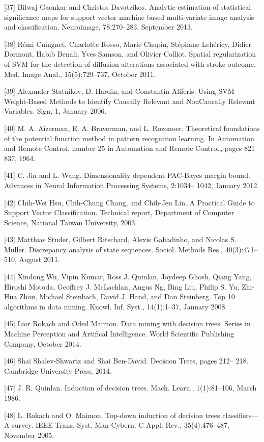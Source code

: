 \documentclass[preprint,12pt]{elsarticle}
\begin{document}
[37] Bilwaj Gaonkar and Christos Davatzikos. Analytic estimation of statistical significance maps for support vector machine based multi-variate image analysis and classification. Neuroimage, 78:270–283, September 2013. 

[38] Rémi Cuingnet, Charlotte Rosso, Marie Chupin, Stéphane Lehéricy, Didier Dormont, Habib Benali, Yves Samson, and Olivier Colliot. Spatial regularization of SVM for the detection of diffusion alterations associated with stroke outcome. Med. Image Anal., 15(5):729–737, October 2011. 

[39] Alexander Statnikov, D. Hardin, and Constantin Aliferis. Using SVM Weight-Based Methods to Identify Causally Relevant and NonCausally Relevant Variables. Sign, 1, January 2006. 

[40] M. A. Aizerman, E. A. Braverman, and L. Rozonoer. Theoretical foundations of the potential function method in pattern recognition learning. In Automation and Remote Control, number 25 in Automation and Remote Control„ pages 821–837, 1964. 

[41] C. Jin and L. Wang. Dimensionality dependent PAC-Bayes margin bound. Advances in Neural Information Processing Systems, 2:1034– 1042, January 2012. 

[42] Chih-Wei Hsu, Chih-Chung Chang, and Chih-Jen Lin. A Practical Guide to Support Vector Classification. Technical report, Department of Computer Science, National Taiwan University, 2003. 

[43] Matthias Studer, Gilbert Ritschard, Alexis Gabadinho, and Nicolas S. Müller. Discrepancy analysis of state sequences. Sociol. Methods Res., 40(3):471–510, August 2011. 

[44] Xindong Wu, Vipin Kumar, Ross J. Quinlan, Joydeep Ghosh, Qiang Yang, Hiroshi Motoda, Geoffrey J. McLachlan, Angus Ng, Bing Liu, Philip S. Yu, Zhi-Hua Zhou, Michael Steinbach, David J. Hand, and Dan Steinberg. Top 10 algorithms in data mining. Knowl. Inf. Syst., 14(1):1–37, January 2008. 

[45] Lior Rokach and Oded Maimon. Data mining with decision trees. Series in Machine Perception and Artifical Intelligence. World Scientific Publishing Company, October 2014. 

[46] Shai Shalev-Shwartz and Shai Ben-David. Decision Trees, pages 212– 218. Cambridge University Press, 2014. 

[47] J. R. Quinlan. Induction of decision trees. Mach. Learn., 1(1):81–106, March 1986. 

[48] L. Rokach and O. Maimon. Top-down induction of decision trees classifiers—A survey. IEEE Trans. Syst. Man Cybern. C Appl. Rev., 35(4):476–487, November 2005. 
\end{document}
